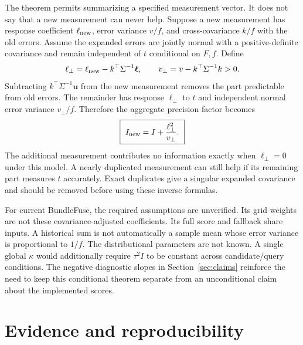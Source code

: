 \documentclass[11pt,a4paper]{article}
\begin{document}
The theorem permits summarizing a specified measurement vector. It does
not say that a new measurement can never help. Suppose a new measurement
has response coefficient $\ell_{\rm new}$, error variance $v/f$, and
cross-covariance $k/f$ with the old errors. Assume the expanded errors are
jointly normal with a positive-definite covariance and remain independent
of $t$ conditional on $F,f$. Define
\begin{equation}
 \ell_\perp=\ell_{\rm new}-k^\top\Sigma^{-1}\boldsymbol\ell,
 \qquad v_\perp=v-k^\top\Sigma^{-1}k>0.
\end{equation}
Subtracting $k^\top\Sigma^{-1}\mathbf u$ from the new measurement
removes the part predictable from old errors. The remainder has response
$\ell_\perp$ to $t$ and independent normal error variance $v_\perp/f$.
Therefore the aggregate precision factor becomes
\begin{equation}
 \boxed{\ I_{\rm new}=I+\frac{\ell_\perp^2}{v_\perp}.\ }
\end{equation}
The additional measurement contributes no information exactly when
$\ell_\perp=0$ under this model. A nearly duplicated measurement can
still help if its remaining part measures $t$ accurately. Exact duplicates
give a singular expanded covariance and should be removed before using
these inverse formulas.

For current BundleFuse, the required assumptions are unverified. Its grid
weights are not these covariance-adjusted coefficients. Its full score and
fallback share inputs. A historical sum is not automatically a sample mean
whose error variance is proportional to $1/f$. The distributional
parameters are not known. A single global $\kappa$ would additionally
require $\tau^2 I$ to be constant across candidate/query conditions.
The negative diagnostic slopes in Section~\ref{sec:claims} reinforce the
need to keep this conditional theorem separate from an unconditional claim
about the implemented scores.

\section{Evidence and reproducibility}
\label{app:evidence}
\end{document}
